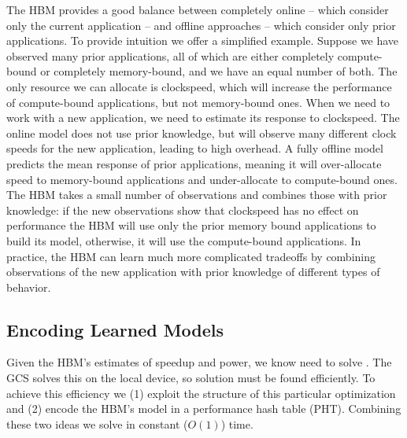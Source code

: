 The HBM provides a good balance between completely online -- which
consider only the current application -- and offline approaches --
which consider only prior applications.   To provide intuition we offer a simplified example.
Suppose we have observed many prior applications, all of which are
either completely compute-bound or completely memory-bound, and we
have an equal number of both.  The only resource we can allocate is
clockspeed, which will increase the performance of compute-bound
applications, but not memory-bound ones.  When we need to work with a
new application, we need to estimate its response to clockspeed.  The
online model does not use prior knowledge, but will observe many
different clock speeds for the new application, leading to high
overhead.  A fully offline model predicts the mean response of prior
applications, meaning it will over-allocate speed to memory-bound
applications and under-allocate to compute-bound ones.  The HBM takes
a small number of observations and combines those with prior
knowledge: if the new observations show that clockspeed has no effect
on performance the HBM will use only the prior memory bound
applications to build its model, otherwise, it will use the
compute-bound applications.  In practice, the HBM can learn much more
complicated tradeoffs by combining observations of the new application
with prior knowledge of different types of behavior.

\subsection{Encoding Learned Models}
Given the HBM's estimates of speedup and power, we know need to solve
.  The GCS solves this on the local device, so
solution must be found efficiently.  To achieve this efficiency we (1)
exploit the structure of this particular optimization and (2) encode
the HBM's model in a performance hash table (PHT).  Combining these
two ideas we solve  in constant ($O(1)$) time.

